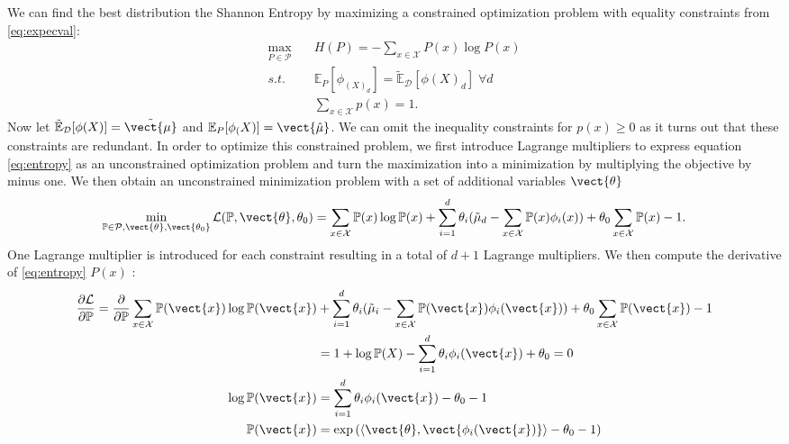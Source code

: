     We can find the best distribution \wrt the Shannon Entropy by maximizing a constrained optimization problem with equality constraints from \eq\ref{eq:expecval}:
    \begin{equation}
        \label{eq:entropy}
        \begin{split}
            \max_{P\in \mathcal{P}} \quad & H(P) = - \sum_{x\in\mathcal{X}} P(x) \log P(x) \\
            s.t. \quad & \mathbb{E}_P[\phi_(X)_d] = \tilde{\mathbb{E}}_{\mathcal{D}}[\phi(X)_d]  \; \forall d\\
            & \sum_{x\in \mathcal{X}} p(x) = 1.
        \end{split}
    \end{equation}
    Now let $\tilde{\mathbb{E}}_{\mathcal{D}}[\phi(X)] = \tilde{\vect{\mu}}$ and $\mathbb{E}_P[\phi_(X)] = \vect{\hat{\mu}}$.
    We can omit the inequality constraints for $p(x) \geq 0$ as it turns out that these constraints are redundant. 
    In order to optimize this constrained problem, we first introduce Lagrange multipliers to express equation \ref{eq:entropy} as an unconstrained optimization problem and turn the maximization into a minimization by multiplying the objective by minus one.
    We then obtain an unconstrained minimization problem with a set of additional variables $\vect{\theta}$
    \begin{equation}
        \min_{\mathbb{P}\in \mathcal{P}, \vect{\theta}, \vect{\theta_0} } \mathcal{L}(\mathbb{P}, \vect{\theta}, \theta_0) = \sum_{x\in\mathcal{X}} \mathbb{P}(x) \log \mathbb{P}(x) + \sum_{i=1}^d \theta_i (\tilde{\mu}_d - \sum_{x \in \mathcal{X}} \mathbb{P}(x) \phi_i(x)) + \theta_0 \sum_{x\in\mathcal{X}} \mathbb{P}(x) -1.
    \end{equation}
    One Lagrange multiplier is introduced for each constraint resulting in a total of $d+1$ Lagrange multipliers.
    We then compute the derivative of \eq\ref{eq:entropy} \wrt $P(x)$ :
    \begin{equation}
        \begin{split}
        \frac{\partial \mathcal{L}}{\partial \mathbb{P}} =  \frac{\partial}{\partial \mathbb{P}} \sum_{x\in\mathcal{X}} \mathbb{P}(\vect{x}) \log \mathbb{P}(\vect{x}) &+ \sum_{i=1}^d \theta_i (\tilde{\mu}_i - \sum_{x \in \mathcal{X}} \mathbb{P}(\vect{x}) \phi_i(\vect{x})) + \theta_0 \sum_{x\in\mathcal{X}} \mathbb{P}(\vect{x}) -1 \\ 
        &= 1 + \log \mathbb{P}(X) - \sum_{i=1}^d \theta_i  \phi_i(\vect{x}) + \theta_0 = 0 \\
        \log \mathbb{P}(\vect{x}) &=  \sum_{i=1}^d \theta_i  \phi_i(\vect{x}) - \theta_0 - 1 \\
        \mathbb{P}(\vect{x}) &= \exp{(\langle\vect{\theta}, \vect{\phi_i(\vect{x})} \rangle - \theta_0 - 1)} \\
    \end{split}
    \end{equation}

